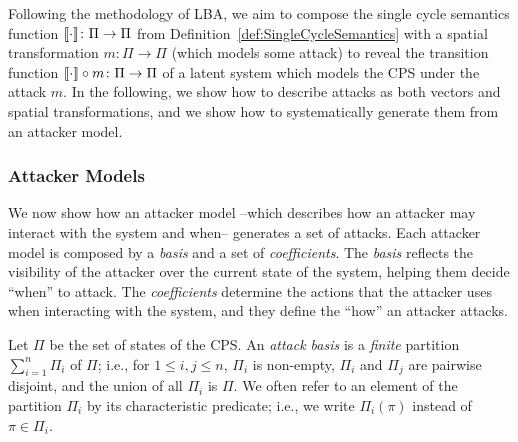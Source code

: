 {%
Following the methodology of LBA, we aim to compose the single cycle semantics function ${{{\llbracket\cdot\rrbracket}}}\colon\Pi\rightarrow\Pi$ from Definition~\ref{def:SingleCycleSemantics} with a spatial transformation $m\colon \Pi\rightarrow\Pi$ (which models some attack) to reveal the transition function ${{{\llbracket\cdot\rrbracket}}}\circ m\colon\Pi\rightarrow\Pi$ of a latent system which models the CPS under the attack $m$. In the following, we show how to describe attacks as both vectors and spatial transformations, and we show how to systematically generate them from an attacker model.

\subsubsection{Attacker Models}
We now show how an attacker model --which describes how an attacker may interact with the system and when-- generates a set of attacks. Each attacker model is composed by a \emph{basis} and a set of \emph{coefficients}. The \emph{basis} reflects the visibility of the attacker over the current state of the system, helping them decide ``when'' to attack. The \emph{coefficients} determine the actions that the attacker uses when interacting with the system, and they define the ``how'' an attacker attacks.

\begin{definition}
  \label{def:AttackBasis}
Let $\Pi$ be the set of states of the CPS. An \emph{attack basis} is a \emph{finite} partition $\sum_{i=1}^n \Pi_i$ of $\Pi$; i.e., for $1\leq i,j \leq n$, $\Pi_i$ is non-empty, $\Pi_i$ and $\Pi_j$ are pairwise disjoint, and the union of all $\Pi_i$ is $\Pi$. We often refer to an element of the partition $\Pi_i$ by its characteristic predicate; i.e., we write $\Pi_i(\pi)$ instead of $\pi\in \Pi_i$.


\end{definition}}
